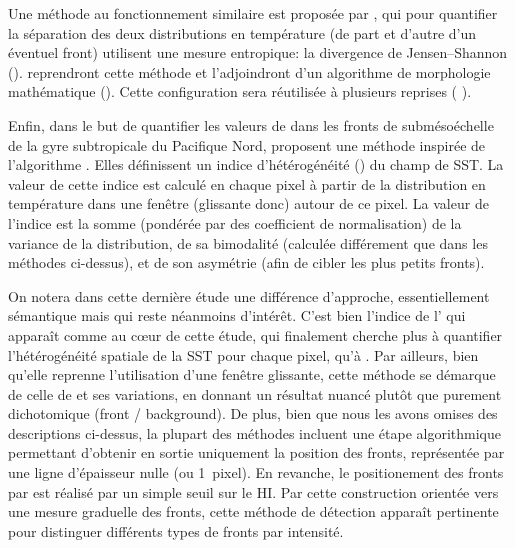 Une méthode au fonctionnement similaire est proposée par \textcite{vazquez_1999}, qui pour quantifier la séparation des deux distributions en température (de part et d'autre d'un éventuel front) utilisent une mesure entropique: la divergence de Jensen--Shannon (\cite{barranco-lopez_1995}).
\textcite{shimada_2005} reprendront cette méthode et l'adjoindront d'un algorithme de morphologie mathématique (\cite{jiang_1997}).
Cette configuration sera réutilisée à plusieurs reprises (\cite{lan_2012} ).

Enfin, dans le but de quantifier les valeurs de  dans les fronts de submésoéchelle de la gyre subtropicale du Pacifique Nord, \textcite{liu_2016} proposent une méthode inspirée de l'algorithme .
Elles définissent un indice d'hétérogénéité () du champ de SST.
La valeur de cette indice est calculé en chaque pixel à partir de la distribution en température dans une fenêtre (glissante donc) autour de ce pixel.
La valeur de l'indice est la somme (pondérée par des coefficient de normalisation) de la variance de la distribution, de sa bimodalité (calculée différement que dans les méthodes ci-dessus), et de son asymétrie (afin de cibler les plus petits fronts).

On notera dans cette dernière étude une différence d'approche, essentiellement sémantique mais qui reste néanmoins d'intérêt.
C'est bien l'indice de l' qui apparaît comme au cœur de cette étude, qui finalement cherche plus à quantifier l'hétérogénéité spatiale de la SST pour chaque pixel, qu'à .
Par ailleurs, bien qu'elle reprenne l'utilisation d'une fenêtre glissante, cette méthode se démarque de celle de  et ses variations, en donnant un résultat nuancé plutôt que purement dichotomique (front / background).
De plus, bien que nous les avons omises des descriptions ci-dessus, la plupart des méthodes incluent une étape algorithmique permettant d'obtenir en sortie uniquement la position des fronts, représentée par une ligne d'épaisseur nulle (ou 1~pixel).
En revanche, le positionement des fronts par \citeauthor{liu_2016} est réalisé par un simple\footnotemark{} seuil sur le HI.
Par cette construction orientée vers une mesure graduelle des fronts, cette méthode de détection apparaît pertinente pour distinguer différents types de fronts par intensité.

